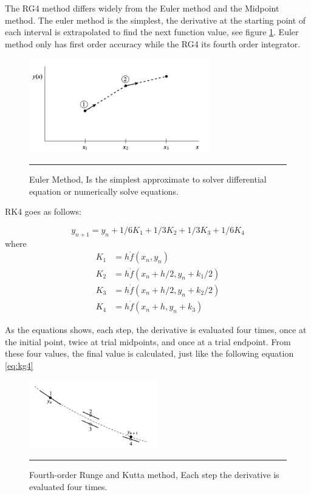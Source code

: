 The RG4 method differs widely from the Euler method and the Midpoint method. The euler method is the simplest, the derivative at the starting point of each interval is extrapolated to find the next function value, see figure \ref{fig:euler}. Euler method only has first order accuracy while the RG4 its fourth order integrator.

\begin{figure}[htbp]
	\centering
		\includegraphics[width=0.7\textwidth]{Figures/euler.png}
		\rule{35em}{0.5pt}
	\caption[Euler Method]{Euler Method, Is the simplest approximate to solver differential equation or numerically solve equations.}
	\label{fig:euler}
\end{figure}

RK4 goes as follows:

\begin{equation} \label{eq:rk4}
y_{n+1} = y_{n} + 1/6 K_{1} + 1/3 K_{2} +1/3 K_{3} + 1/6 K_{4}
\end{equation}
where
\begin{equation}
\begin{split} \label{eq:rksplit}
K_{1} &= h \dot f(x_{n}, y_{n}) \\
K_{2} &= h \dot f(x_{n} + h/2, y_{n} + k_{1}/2) \\
K_{3} &= h \dot f(x_{n} + h/2, y_{n} + k_{2}/2) \\
K_{4} &= h \dot f(x_{n} + h, y_{n} + k_{3})
\end{split}
\end{equation}

As the equations shows, each step, the derivative is evaluated four times, once at the initial point, twice at trial midpoints, and once at a trial endpoint. From these four values, the final value is calculated, just like the following equation \ref{eq:kg4}

\begin{figure}[htbp]
	\centering
		\includegraphics[width=0.5\textwidth]{Figures/rk4.png}
		\rule{35em}{0.5pt}
	\caption[Fourth-order Runge and Kutta Method]{Fourth-order Runge and Kutta method, Each step the derivative is evaluated four times. }
	\label{fig:kutta}
\end{figure}

